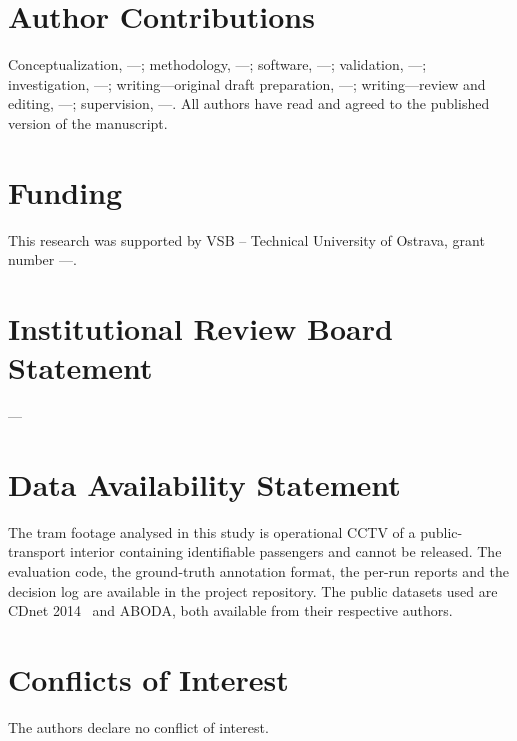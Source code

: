 %

\section*{Author Contributions}
Conceptualization, ---; methodology, ---; software, ---; validation, ---;
investigation, ---; writing---original draft preparation, ---;
writing---review and editing, ---; supervision, ---. All authors have read and
agreed to the published version of the manuscript.

\section*{Funding}
This research was supported by VSB -- Technical University of Ostrava,
grant number ---.

\section*{Institutional Review Board Statement}
---

\section*{Data Availability Statement}
The tram footage analysed in this study is operational CCTV of a
public-transport interior containing identifiable passengers and cannot be
released. The evaluation code, the ground-truth annotation format, the per-run
reports and the decision log are available in the project repository. The
public datasets used are CDnet 2014~\cite{Wang_2014} and ABODA, both available
from their respective authors.

\section*{Conflicts of Interest}
The authors declare no conflict of interest.
